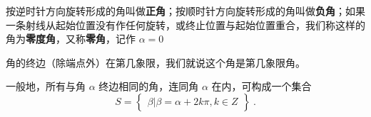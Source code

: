 按逆时针方向旋转形成的角叫做\textbf{正角}；按顺时针方向旋转形成的角叫做\textbf{负角}；如果一条射线从起始位置没有作任何旋转，或终止位置与起始位置重合，我们称这样的角为\textbf{零度角}，又称\textbf{零角}，记作 $\alpha = 0$

角的终边（除端点外）在第几象限，我们就说这个角是第几象限角。

一般地，所有与角 $\alpha$ 终边相同的角，连同角 $\alpha$ 在内，可构成一个集合
\begin{equation}
S = \begin{Bmatrix} \beta|\beta=\alpha+2k\pi,k \in Z \end{Bmatrix}~.
\end{equation}


